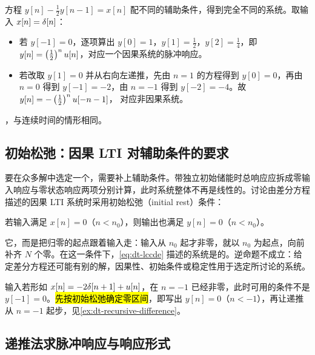 \begin{example}[同一差分方程的两种初值]
  方程 $y[n]-\frac12y[n-1]=x[n]$ 配不同的辅助条件，得到完全不同的系统。取输入 $x[n]=\delta[n]$：
  \begin{itemize}
    \item 若 $y[-1]=0$，逐项算出 $y[0]=1$，$y[1]=\frac12$，$y[2]=\frac14$，即 $y[n]=\left(\frac12\right)^nu[n]$，对应一个因果系统的脉冲响应。
    \item 若改取 $y[1]=0$ 并从右向左递推，先由 $n=1$ 的方程得到
    $y[0]=0$，再由 $n=0$ 得到 $y[-1]=-2$，由 $n=-1$ 得到
    $y[-2]=-4$。故 $y[n]=-\left(\frac12\right)^nu[-n-1]$，
    对应非因果系统。
  \end{itemize}
  ，与连续时间的情形相同。
\end{example}

\subsection{初始松弛：因果 LTI 对辅助条件的要求}

要在众多解中选定一个，需要补上辅助条件。带独立初始储能时总响应应拆成零输入响应与零状态响应两项分别计算，此时系统整体不再是线性的。讨论由差分方程描述的因果 LTI 系统时采用初始松弛（initial rest）条件：

\begin{definition}[初始松弛]
  \label{def:dt-initial-rest}
  若输入满足 $x[n]=0$（$n<n_0$），则输出也满足 $y[n]=0$（$n<n_0$）。
\end{definition}

它，而是把归零的起点跟着输入走：输入从 $n_0$ 起才非零，就以 $n_0$ 为起点，向前补齐 $N$ 个零。在这一条件下，\cref{eq:dt-lccde} 描述的系统是的。逆命题不成立：给定差分方程还可能有别的解，因果性、初始条件或稳定性用于选定所讨论的系统。

\begin{pitfall}[输入含超前项时仍按零下标起步]
  输入若形如 $x[n]=-2\delta[n+1]+u[n]$，在 $n=-1$ 已经非零，此时可用的条件不是 $y[-1]=0$。\hl{先按初始松弛确定零区间}，即写出 $y[n]=0$（$n<-1$），再让递推从 $n=-1$ 起步，见\cref{ex:dt-recursive-difference}。
\end{pitfall}

\subsection{递推法求脉冲响应与响应形式}

